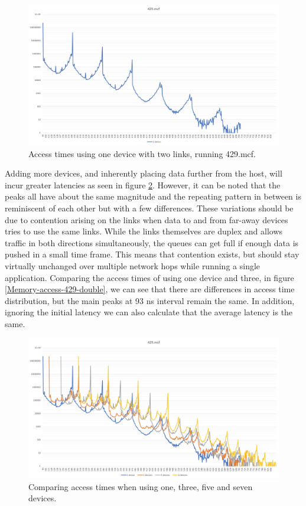 \begin{figure}[!ht]
    \centering
    \includegraphics[width=1.0\linewidth]{figure/429-x_4-1.jpg}
    \caption{Access times using one device with two links, running 429.mcf.}
    \label{Memory-access-429-single}
\end{figure}

Adding more devices, and inherently placing data further from the host, will incur greater latencies as seen in figure \ref{Memory-access-429}. However, it can be noted that the peaks all have about the same magnitude and the repeating pattern in between is reminiscent of each other but with a few differences. These variations should be due to contention arising on the links when data to and from far-away devices tries to use the same links. While the links themselves are duplex and allows traffic in both directions simultaneously, the queues can get full if enough data is pushed in a small time frame. This means that contention exists, but should stay virtually unchanged over multiple network hops while running a single application. Comparing the access times of using one device and three, in figure \ref{Memory-access-429-double}, we can see that there are differences in access time distribution, but the main peaks at 93 ns interval remain the same. In addition, ignoring the initial latency we can also calculate that the average latency is the same. 
\bigskip

\begin{figure}[!ht]
    \centering
    \includegraphics[width=1.0\linewidth]{figure/429-x_4.jpg}
    \caption{Comparing access times when using one, three, five and seven devices.}
    \label{Memory-access-429}
\end{figure}

